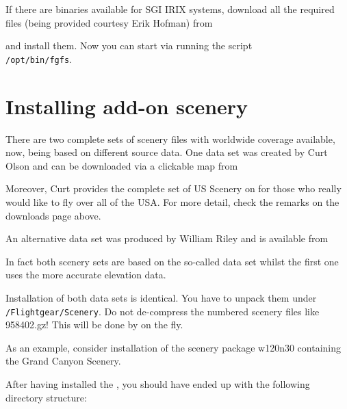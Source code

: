 If there are binaries available for SGI IRIX systems, download all the required files (being provided courtesy Erik Hofman)
from
 \medskip

 \medskip

 \noindent
 and install them. Now you can start \FlightGear{} via running the script\\
\texttt{/opt/bin/fgfs}.

\section{Installing add-on scenery}

There are two complete sets of scenery files with worldwide coverage available, now, being based on different source data. One data set was created by Curt Olson and can be downloaded via a clickable map from
 \medskip

 \medskip

 \noindent
Moreover, Curt provides the complete set of US Scenery on  for those who
really would like to fly over all of the USA. For more detail, check the remarks on the
downloads page above.

An alternative data set was produced by William Riley and is available from
\medskip

 \medskip

In fact both scenery sets are based on the so-called  data
set whilst the first one uses the more accurate  elevation
data.

Installation of both data sets is identical. You have to unpack them
under \texttt{/Flightgear/Scenery}. Do not de-compress the numbered
scenery files like 958402.gz! This will be done by \FlightGear{} on the
fly.

As an example, consider installation of the scenery package w120n30 containing the Grand
Canyon Scenery.

After having installed the , you should have ended up with the
following directory structure:
\medskip

